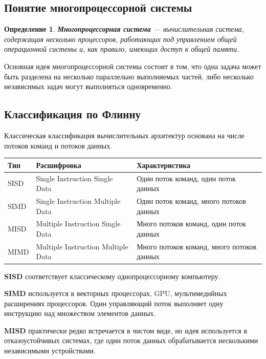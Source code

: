 \documentclass[12pt,a4paper]{article}
\newtheorem{definition}{Определение}
\begin{document}
\subsection{Понятие многопроцессорной системы}

\begin{definition}
\textbf{Многопроцессорная система} --- вычислительная система, содержащая несколько процессоров, работающих под управлением общей операционной системы и, как правило, имеющих доступ к общей памяти.
\end{definition}

Основная идея многопроцессорной системы состоит в том, что одна задача может быть разделена на несколько параллельно выполняемых частей, либо несколько независимых задач могут выполняться одновременно.

\subsection{Классификация по Флинну}

Классическая классификация вычислительных архитектур основана на числе потоков команд и потоков данных.

\begin{center}
\begin{tabular}{lll}
\toprule
Тип & Расшифровка & Характеристика \\
\midrule
SISD & Single Instruction Single Data & Один поток команд, один поток данных \\
SIMD & Single Instruction Multiple Data & Один поток команд, много потоков данных \\
MISD & Multiple Instruction Single Data & Много потоков команд, один поток данных \\
MIMD & Multiple Instruction Multiple Data & Много потоков команд, много потоков данных \\
\bottomrule
\end{tabular}
\end{center}

\textbf{SISD} соответствует классическому однопроцессорному компьютеру.

\textbf{SIMD} используется в векторных процессорах, GPU, мультимедийных расширениях процессоров. Один управляющий поток выполняет одну инструкцию над множеством элементов данных.

\textbf{MISD} практически редко встречается в чистом виде, но идея используется в отказоустойчивых системах, где один поток данных обрабатывается несколькими независимыми устройствами.
\end{document}
